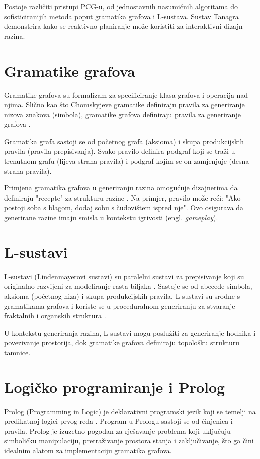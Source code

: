 \documentclass[]{foi}
\begin{document}
Postoje različiti pristupi PCG-u, od jednostavnih nasumičnih algoritama do sofisticiranijih metoda poput gramatika grafova i L-sustava. Sustav Tanagra \cite{smith2011Tanagra} demonstrira kako se reaktivno planiranje može koristiti za interaktivni dizajn razina.

\section{Gramatike grafova}
Gramatike grafova su formalizam za specificiranje klasa grafova i operacija nad njima. Slično kao što Chomskyjeve gramatike definiraju pravila za generiranje nizova znakova (simbola), gramatike grafova definiraju pravila za generiranje grafova \cite{dormans2010Adventures}.

Gramatika grafa sastoji se od početnog grafa (aksioma) i skupa produkcijskih pravila (pravila prepisivanja). Svako pravilo definira podgraf koji se traži u trenutnom grafu (lijeva strana pravila) i podgraf kojim se on zamjenjuje (desna strana pravila).

Primjena gramatika grafova u generiranju razina omogućuje dizajnerima da definiraju "recepte" za strukturu razine \cite{rozenberg1997HandbookGraphGrammars}. Na primjer, pravilo može reći: "Ako postoji soba s blagom, dodaj sobu s čudovištem ispred nje". Ovo osigurava da generirane razine imaju smisla u kontekstu igrivosti (engl. \textit{gameplay}).

\section{L-sustavi}
L-sustavi (Lindenmayerovi sustavi) su paralelni sustavi za prepisivanje koji su originalno razvijeni za modeliranje rasta biljaka \cite{lindenmayer1968Mathematical}. Sastoje se od abecede simbola, aksioma (početnog niza) i skupa produkcijskih pravila. L-sustavi su srodne s gramatikama grafova i koriste se u proceduralnom generiranju za stvaranje fraktalnih i organskih struktura \cite{prusinkiewicz1990AlgorithmicBeauty}.

U kontekstu generiranja razina, L-sustavi mogu poslužiti za generiranje hodnika i povezivanje prostorija, dok gramatike grafova definiraju topološku strukturu tamnice.

\section{Logičko programiranje i Prolog}
Prolog (Programming in Logic) je deklarativni programski jezik koji se temelji na predikatnoj logici prvog reda \cite{bratko2012PrologProgramming}. Program u Prologu sastoji se od činjenica i pravila. Prolog je izuzetno pogodan za rješavanje problema koji uključuju simboličku manipulaciju, pretraživanje prostora stanja i zaključivanje, što ga čini idealnim alatom za implementaciju gramatika grafova.
\end{document}
